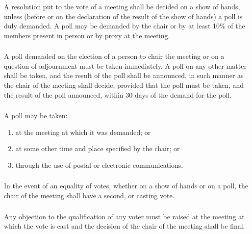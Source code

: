         \subsubsection{}
        A resolution put to the vote of a meeting shall be decided on a show of hands, unless (before or on the declaration of the result of the show of hands) a poll is duly demanded. A poll may be demanded by the chair or by at least 10\% of the members present in person or by proxy at the meeting.

        \subsubsection{}
        A poll demanded on the election of a person to chair the meeting or on a question of adjournment must be taken immediately. A poll on any other matter shall be taken, and the result of the poll shall be announced, in such manner as the chair of the meeting shall decide, provided that the poll must be taken, and the result of the poll announced, within 30 days of the demand for the poll.

        \subsubsection{}
        A poll may be taken:
        \begin{enumerate}
            \item at the meeting at which it was demanded; or
            \item at some other time and place specified by the chair; or
            \item through the use of postal or electronic communications.
        \end{enumerate}

        \subsubsection{}
        In the event of an equality of votes, whether on a show of hands or on a poll, the chair of the meeting shall have a second, or casting vote.

        \subsubsection{}
        Any objection to the qualification of any voter must be raised at the meeting at which the vote is cast and the decision of the chair of the meeting shall be final.

